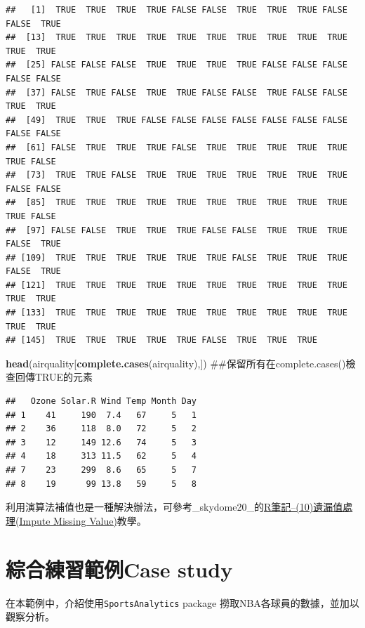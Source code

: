 \documentclass[]{book}
\newenvironment{Shaded}{\begin{snugshade}}{\end{snugshade}}
\newcommand{\KeywordTok}[1]{\textcolor[rgb]{0.13,0.29,0.53}{\textbf{{#1}}}}
\newcommand{\NormalTok}[1]{{#1}}
\theoremstyle{definition}
\theoremstyle{definition}
\theoremstyle{remark}
\begin{document}
\begin{verbatim}
##   [1]  TRUE  TRUE  TRUE  TRUE FALSE FALSE  TRUE  TRUE  TRUE FALSE FALSE  TRUE
##  [13]  TRUE  TRUE  TRUE  TRUE  TRUE  TRUE  TRUE  TRUE  TRUE  TRUE  TRUE  TRUE
##  [25] FALSE FALSE FALSE  TRUE  TRUE  TRUE  TRUE FALSE FALSE FALSE FALSE FALSE
##  [37] FALSE  TRUE FALSE  TRUE  TRUE FALSE FALSE  TRUE FALSE FALSE  TRUE  TRUE
##  [49]  TRUE  TRUE  TRUE FALSE FALSE FALSE FALSE FALSE FALSE FALSE FALSE FALSE
##  [61] FALSE  TRUE  TRUE  TRUE FALSE  TRUE  TRUE  TRUE  TRUE  TRUE  TRUE FALSE
##  [73]  TRUE  TRUE FALSE  TRUE  TRUE  TRUE  TRUE  TRUE  TRUE  TRUE FALSE FALSE
##  [85]  TRUE  TRUE  TRUE  TRUE  TRUE  TRUE  TRUE  TRUE  TRUE  TRUE  TRUE FALSE
##  [97] FALSE FALSE  TRUE  TRUE  TRUE FALSE FALSE  TRUE  TRUE  TRUE FALSE  TRUE
## [109]  TRUE  TRUE  TRUE  TRUE  TRUE  TRUE FALSE  TRUE  TRUE  TRUE FALSE  TRUE
## [121]  TRUE  TRUE  TRUE  TRUE  TRUE  TRUE  TRUE  TRUE  TRUE  TRUE  TRUE  TRUE
## [133]  TRUE  TRUE  TRUE  TRUE  TRUE  TRUE  TRUE  TRUE  TRUE  TRUE  TRUE  TRUE
## [145]  TRUE  TRUE  TRUE  TRUE  TRUE FALSE  TRUE  TRUE  TRUE
\end{verbatim}

\begin{Shaded}
\begin{Highlighting}[]
\KeywordTok{head}\NormalTok{(airquality[}\KeywordTok{complete.cases}\NormalTok{(airquality),]) ##保留所有在complete.cases()檢查回傳TRUE的元素}
\end{Highlighting}
\end{Shaded}

\begin{verbatim}
##   Ozone Solar.R Wind Temp Month Day
## 1    41     190  7.4   67     5   1
## 2    36     118  8.0   72     5   2
## 3    12     149 12.6   74     5   3
## 4    18     313 11.5   62     5   4
## 7    23     299  8.6   65     5   7
## 8    19      99 13.8   59     5   8
\end{verbatim}

利用演算法補值也是一種解決辦法，可參考\_skydome20\_的\href{http://www.rpubs.com/skydome20/R-Note10-Missing_Value}{R筆記--(10)遺漏值處理(Impute
Missing Value)}教學。

\section{綜合練習範例Case study}\label{manCase}

在本範例中，介紹使用\texttt{SportsAnalytics} \citep{R-SportsAnalytics}
package 撈取NBA各球員的數據，並加以觀察分析。
\end{document}
